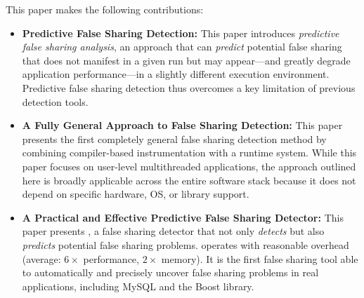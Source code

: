 This paper makes the following contributions:

\begin{itemize}


\item
\textbf{Predictive False Sharing Detection:} This paper introduces \emph{predictive false sharing analysis}, an approach that can \emph{predict} potential false sharing that does not manifest in a given run but may appear---and greatly degrade application performance---in a slightly different execution environment. 
Predictive false sharing detection thus overcomes a key limitation of previous detection tools.

\item
\textbf{A Fully General Approach to False Sharing Detection:} This paper presents the first completely general false sharing detection method by combining compiler-based instrumentation with a runtime system. While this
paper focuses on user-level multithreaded applications, the approach outlined here is broadly applicable across the entire software stack because it does not depend on specific hardware, OS, or library support.

\item
\textbf{A Practical and Effective Predictive False Sharing Detector:} 
This paper presents \Predator{}, a false sharing detector that not only \emph{detects} but also \emph{predicts} potential false sharing problems.
\Predator{} operates with reasonable overhead (average: $6\times$ performance, $2\times$ memory). It is the first false sharing tool able to automatically and precisely uncover
false sharing problems in real applications, including 
MySQL and the Boost library.

\end{itemize}

